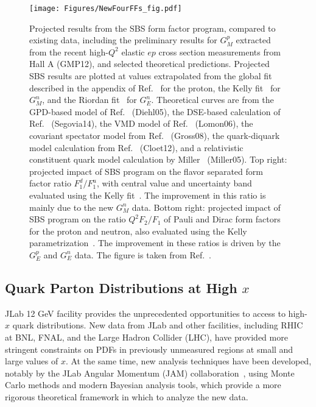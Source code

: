 \begin{figure}[ht]
  \begin{center}
   \texttt{[image: Figures/NewFourFFs\_fig.pdf]}
  \end{center}
  \caption{\label{fig:SBSFF_summaryfig} Projected results from the SBS form factor program, compared to existing data, including the preliminary results for $G_M^p$ extracted from the recent high-$Q^2$ elastic $ep$ cross section measurements from Hall A (GMP12), and selected theoretical predictions. Projected SBS results are plotted at values extrapolated from the global fit described in the appendix of Ref.~\cite{Puckett:2017flj} for the proton, the Kelly fit~\cite{KellyFit} for $G_M^n$, and the Riordan fit~\cite{Riordan:2010id} for $G_E^n$. Theoretical curves are from the GPD-based model of Ref.~\cite{Diehl:2004cx} (Diehl05), the DSE-based calculation of Ref.~\cite{Segovia:2014aza} (Segovia14), the VMD model of Ref.~\cite{Lomon:2006xb,Lomon:2012pn} (Lomon06), the covariant spectator model from Ref.~\cite{Gross:2006fg} (Gross08), the quark-diquark model calculation from Ref.~\cite{Cloet:2012cy} (Cloet12), and a relativistic constituent quark model calculation by Miller~\cite{Miller:2002ig} (Miller05). Top right: projected impact of SBS program on the flavor separated form factor ratio $F_1^d/F_1^u$, with central value and uncertainty band evaluated using the Kelly fit~\cite{KellyFit}. The improvement in this ratio is mainly due to the new $G_M^n$ data. Bottom right: projected impact of SBS program on the ratio $Q^2F_2/F_1$ of Pauli and Dirac form factors for the proton and neutron, also evaluated using the Kelly parametrization~\cite{KellyFit}. The improvement in these ratios is driven by the $G_E^p$ and $G_E^n$ data. The figure is taken from Ref.~\cite{Barabanov_2021}.}
\end{figure}


\subsection{Quark Parton Distributions at High $x$}

JLab 12 GeV facility provides the unprecedented opportunities to access to high-$x$ quark distributions. New data from JLab and other facilities, including RHIC at BNL, FNAL, and the Large Hadron Collider (LHC), have provided more stringent constraints on PDFs in previously unmeasured regions at small and large values of $x$. %
At the same time, new analysis techniques have been developed, notably by the JLab Angular Momentum (JAM) collaboration~\cite{JAM}, using Monte Carlo methods and modern Bayesian analysis tools, which provide a more rigorous theoretical framework in which to analyze the new data.

